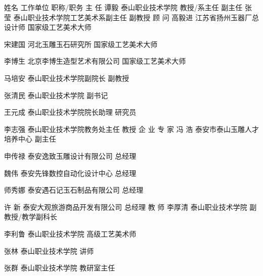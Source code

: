 姓名
工作单位
职称/职务
主  任
谭毅
泰山职业技术学院
教授/系主任
副主任
张 莹
泰山职业技术学院工艺美术系副主任
副教授
顾  问
高毅进
江苏省扬州玉器厂总设计师
国家级工艺美术大师

宋建国
河北玉雕玉石研究所
国家级工艺美术大师

李博生
北京李博生造型艺术有限公司
国家级工艺美术大师

马培安
泰山职业技术学院副院长
副教授

张清民
泰山职业技术学院
副书记

王元成
泰山职业技术学院院长助理
研究员

李志强
泰山职业技术学院教务处主任
教授
企  业
专  家
冯  浩
泰安市泰山玉雕人才培养中心
副主任

申传禄
泰安逸致玉雕设计有限公司
总经理

魏伟
泰安先锋数控自动化设计中心
总经理

师秀娜
泰安遇石记玉石制品有限公司
总经理

许  新
泰安大观旅游商品开发有限公司
总经理
教  师
李厚清
泰山职业技术学院
副教授/教学副科长

李利鲁
泰山职业技术学院
高级工艺美术师

张林
泰山职业技术学院
讲师

张群
泰山职业技术学院
教研室主任

